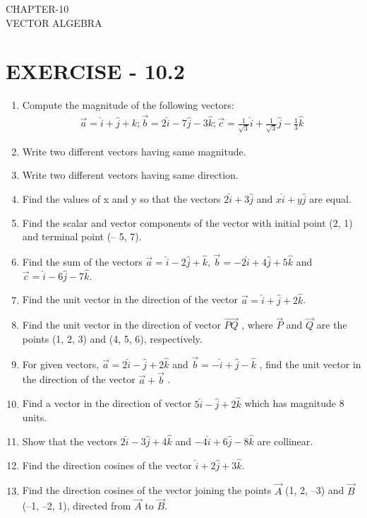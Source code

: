 \documentclass[12pt]{article}
\begin{document}
\begin{center}
\textbf\large{CHAPTER-10 \\ VECTOR ALGEBRA}
\end{center}
\section{EXERCISE - 10.2}
\begin{enumerate}
\item Compute the magnitude of the following vectors:
\begin{align*}
\vec{a}=\hat{i}+\hat{j}+k; \vec{b}=2\hat{i}-7\hat{j}-3\hat{k}; \vec{c}=\frac{1}{\sqrt{3}}\hat{i}+\frac{1}{\sqrt{3}}\hat{j}-\frac{1}{3}\hat{k}
\end{align*}
\item Write two different vectors having same magnitude.
\item Write two different vectors having same direction.
\item Find the values of x and y so that the vectors $2\hat{i}+3\hat{j}$ and $x\hat{i}+y\hat{j}$ are equal.
\item Find the scalar and vector components of the vector with initial point (2, 1) and
terminal point (– 5, 7).
\item Find the sum of the vectors $\vec{a}=\hat{i}-2\hat{j}+\hat{k}$, $\vec{b}=-2\hat{i}+4\hat{j}+5\hat{k}$ and $\vec{c}=\hat{i}-6\hat{j}-7\hat{k}$.
\item Find the unit vector in the direction of the vector $\vec{a}=\hat{i}+\hat{j}+2\hat{k}$.
\item Find the unit vector in the direction of vector $\overrightarrow{PQ}$ , where $\vec{P}$ and $\Vec{Q}$ are the points
(1, 2, 3) and (4, 5, 6), respectively.
\item For given vectors, $\vec{a}=2\hat{i}-\hat{j}+2\hat{k}$ and $\vec{b}=-\hat{i}+\hat{j}-\hat{k}$ , find the unit vector in the
direction of the vector $\vec{a}+\vec{b}$
.
\item Find a vector in the direction of vector $5\hat{i}-\hat{j}+2\hat{k}$ which has magnitude 8 units.
\item Show that the vectors $2\hat{i}-3\hat{j}+4\hat{k}$ and $-4\hat{i}+6\hat{j}-8\hat{k}$ are collinear.
\item Find the direction cosines of the vector $\hat{i}+2\hat{j}+3\hat{k}$.
\item Find the direction cosines of the vector joining the points $\Vec{A}$ (1, 2, –3) and
$\Vec{B}$(–1, –2, 1), directed from $\Vec{A}$ to $\Vec{B}$.

\end{enumerate}
\end{document}
